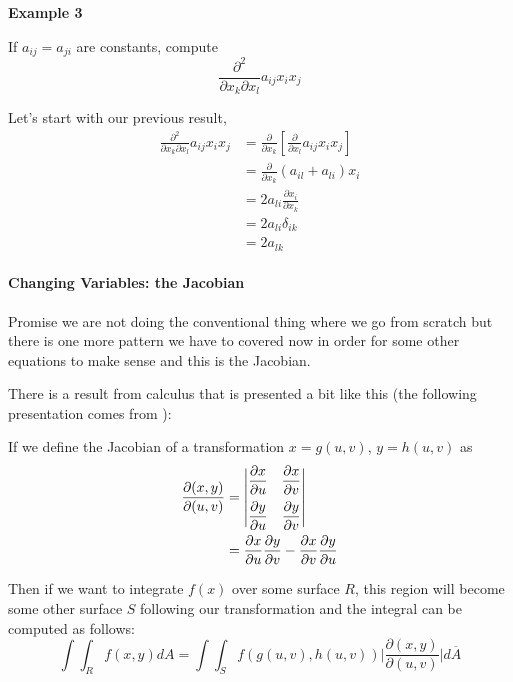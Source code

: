 \textbf{Example 3}

If $a_{ij} = a_{ji}$ are constants, compute
$$
\frac{\partial^2}{\partial x_k \partial x_l} a_{ij} x_i x_j
$$

Let's start with our previous result,
\begin{align*}
\frac{\partial^2}{\partial x_k \partial x_l} a_{ij} x_i x_j &=
    \frac{\partial}{\partial x_k} \left[ \frac{\partial}{\partial x_l} a_{ij} x_i x_j \right] \\
&= \frac{\partial}{\partial x_k} (a_{il} + a_{li}) x_i \\
&= 2 a_{li} \frac{\partial x_i}{\partial x_k} \\
&= 2 a_{li} \delta_{ik} \\
&= 2 a_{lk}
\end{align*}



\paragraph{Changing Variables: the Jacobian}


Promise we are not doing the conventional thing where we go from scratch but there is one more pattern we have to covered
now in order for some other equations to make sense and this is the Jacobian.


There is a result from calculus that is presented a bit like this (the following presentation comes from
\cite{jacobian}):


If we define the Jacobian of a transformation $x = g(u,v)$, $y = h(u,v)$ as
\begin{align*}
\frac{ \partial (x,y) }{ \partial (u,v) } &= 
\begin{vmatrix}
\dfrac{ \partial x }{ \partial u } & \dfrac{ \partial x }{ \partial v } \\ \addlinespace
\dfrac{ \partial y }{ \partial u } & \dfrac{ \partial y }{ \partial v }
\end{vmatrix} \\
&= \frac{ \partial x }{ \partial u } \frac{ \partial y }{ \partial v } -
    \frac{ \partial x }{ \partial v }\frac{ \partial y }{ \partial u }
\end{align*}

Then if we want to integrate $f(x)$ over some surface $R$, this region will become some other surface $S$
following our transformation and the integral can be computed as follows:
$$
\int \int_{R} f(x,y) dA
= \int \int_{S} f\left( g(u,v), h(u,v) \right) \Biggl| \frac{ \partial (x,y) }{ \partial (u,v) } \Biggl| d\overline{A}
$$

